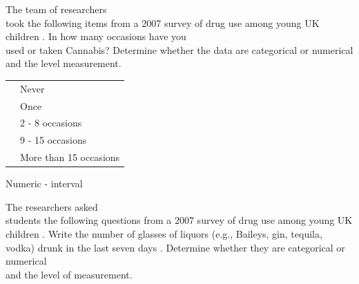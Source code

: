 \documentclass[11pt, chapterprefix=true]{scrbook}\usepackage[]{graphicx}\usepackage[]{color}
\begin{document}
\begin{exercises}
	\begin{exercise}  %

	The team of researchers \\ took the following items from a 2007 survey of drug use among young UK children \cite{Teen2007}.  In how many occasions have you \\ used or taken Cannabis?  Determine whether the data are categorical or numerical and the level measurement.


  \begin{table}[htbp]
   \centering
  \begin{tabular}{@{} rl @{}} \hline %
    \underline{ \phantom{xxx} } & Never \\
    \underline{ \phantom{xxx} } & Once \\
    \underline{ \phantom{xxx} } & 2 - 8 occasions \\
    \underline{ \phantom{xxx} } & 9 - 15 occasions \\
    \underline{ \phantom{xxx} } & More than 15 occasions \\ \hline
   \end{tabular}
   \end{table}

    \vspace{4mm}
  \end{exercise}
  \vspace{2mm}
  \begin{solution}   %

    Numeric - interval

  \end{solution}

	\begin{exercise}  %

	The researchers asked \\ students the following questions from a 2007 survey of drug use among young UK children  \cite{Teen2007}.
	Write the number of glasses of liquors (e.g., Baileys, gin, tequila, vodka) drunk in the last seven days   \underline{\phantom{xxxx}}.
	 Determine whether they are categorical or numerical \\ and the level of measurement.


\end{exercise}
\end{exercises}
\end{document}
